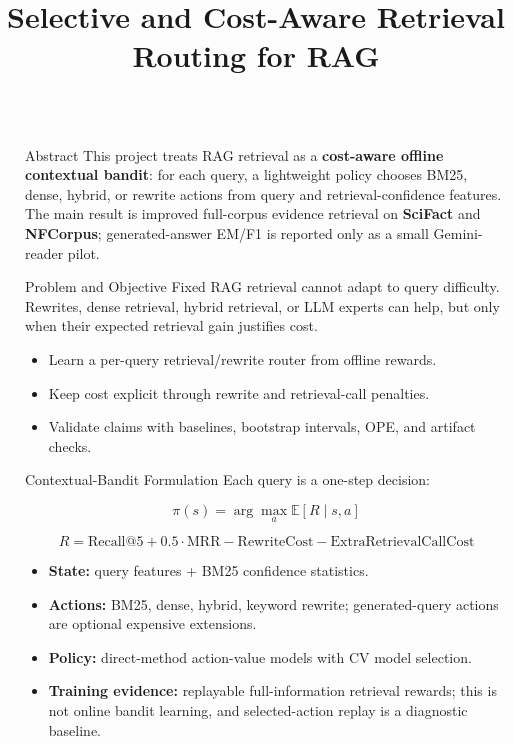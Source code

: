 \documentclass[final,20pt]{beamer}
\title{Selective and Cost-Aware Retrieval Routing for RAG}
\author{\texorpdfstring{{\cjkfont 蔡尚融} \and {\cjkfont 李羿昕} \and {\cjkfont 李政緯}}{Tsai Shang-Jung; Li Yi-Hsin; Li Cheng-Wei}}
\institute[shortinst]{National Yang Ming Chiao Tung University}
\newlength{\sepwidth}
\newlength{\colwidth}
\newcommand{\separatorcolumn}{\begin{column}{\sepwidth}\end{column}}
\begin{document}
\begin{frame}[t]
\begin{columns}[t]
\separatorcolumn

\begin{column}{\colwidth}

  \begin{block}{Abstract}
    This project treats RAG retrieval as a \textbf{cost-aware offline contextual bandit}: for each query, a lightweight policy chooses BM25, dense, hybrid, or rewrite actions from query and retrieval-confidence features. The main result is improved full-corpus evidence retrieval on \textbf{SciFact} and \textbf{NFCorpus}; generated-answer EM/F1 is reported only as a small Gemini-reader pilot.
  \end{block}

  \begin{alertblock}{Problem and Objective}
    Fixed RAG retrieval cannot adapt to query difficulty. Rewrites, dense retrieval, hybrid retrieval, or LLM experts can help, but only when their expected retrieval gain justifies cost.

    \begin{itemize}
      \item Learn a per-query retrieval/rewrite router from offline rewards.
      \item Keep cost explicit through rewrite and retrieval-call penalties.
      \item Validate claims with baselines, bootstrap intervals, OPE, and artifact checks.
    \end{itemize}
  \end{alertblock}

  \begin{block}{Contextual-Bandit Formulation}
    Each query is a one-step decision:

    \[
      \pi(s) = \arg\max_a \mathbb{E}[R \mid s, a]
    \]

    \vspace{-0.5em}
    \[
      R = \mathrm{Recall@5} + 0.5 \cdot \mathrm{MRR}
          - \mathrm{RewriteCost} - \mathrm{ExtraRetrievalCallCost}
    \]

    \begin{itemize}
      \item \textbf{State:} query features + BM25 confidence statistics.
      \item \textbf{Actions:} BM25, dense, hybrid, keyword rewrite; generated-query actions are optional expensive extensions.
      \item \textbf{Policy:} direct-method action-value models with CV model selection.
      \item \textbf{Training evidence:} replayable full-information retrieval rewards; this is not online bandit learning, and selected-action replay is a diagnostic baseline.
    \end{itemize}
  \end{block}


\end{column}
\end{columns}
\end{frame}
\end{document}
